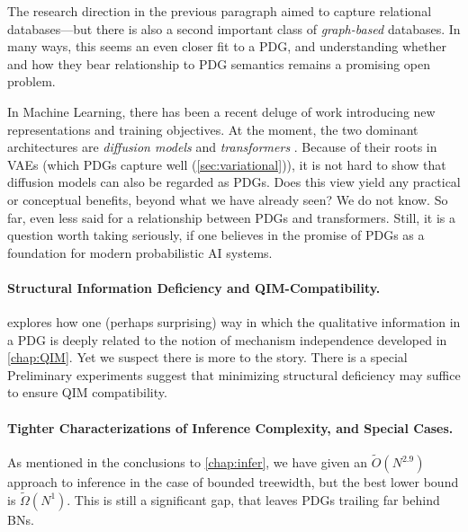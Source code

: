 The research direction in the previous paragraph aimed to capture relational databases---but there is also a second important class of \emph{graph-based} databases.
In many ways, this seems an even closer fit to a PDG, and understanding whether and how they bear relationship to PDG semantics remains a promising open problem. 

In Machine Learning, there has been a recent deluge of work introducing new representations and training objectives. At the moment, the two dominant architectures are \emph{diffusion models} \citep{DDPMs} and \emph{transformers} \cite{transformers...}. 
Because of their roots in VAEs (which PDGs capture well (\cref{sec:variational})), it is not hard to show that diffusion models can also be regarded as PDGs. %
    Does this view yield any practical or conceptual benefits, beyond what we have already seen? 
    We do not know.
%
So far, even less said for a relationship between PDGs and transformers.
Still, it is a question worth taking seriously, if one believes in the promise of PDGs as a foundation for modern probabilistic AI systems.      

\paragraph{Structural Information Deficiency and QIM-Compatibility.}
 explores how one (perhaps surprising) way in which the qualitative information in a PDG is deeply related to the notion of mechanism independence developed in \cref{chap:QIM}.
Yet we suspect there is more to the story. 
There is a special 
Preliminary experiments suggest that minimizing structural deficiency may suffice to ensure QIM compatibility. 

\paragraph{Tighter Characterizations of Inference Complexity, and Special Cases.}
As mentioned in the conclusions to \cref{chap:infer}, we have given an $\tilde O(N^{2.9})$ approach to inference in the case of bounded treewidth, but the best lower bound is $\tilde \Omega( N^1)$. 
This is still a significant gap, that leaves PDGs trailing far behind BNs.

